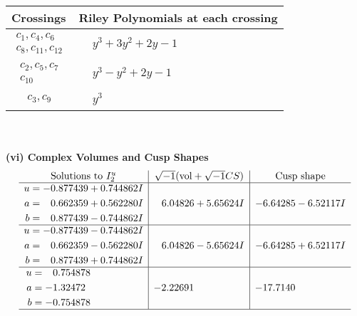 \documentclass[1p]{elsarticle_modified}
\theoremstyle{definition}
\newcommand{\I}{\sqrt{-1}}
\begin{document}
\begin{tabular}{m{50pt}|m{274pt}}
Crossings & \hspace{64pt}Riley Polynomials at each crossing \\
\hline $$\begin{aligned}c_{1},c_{4},c_{6}\\c_{8},c_{11},c_{12}\end{aligned}$$&$\begin{aligned}
&y^3+3 y^2+2 y-1
\end{aligned}$\\
\hline $$\begin{aligned}c_{2},c_{5},c_{7}\\c_{10}\end{aligned}$$&$\begin{aligned}
&y^3- y^2+2 y-1
\end{aligned}$\\
\hline $$\begin{aligned}c_{3},c_{9}\end{aligned}$$&$\begin{aligned}
&y^3
\end{aligned}$\\
\hline
\end{tabular}\\~\\
\newpage\flushleft \textbf{(vi) Complex Volumes and Cusp Shapes}
$$\begin{array}{c|c|c}  
\text{Solutions to }I^u_{2}& \I (\text{vol} + \sqrt{-1}CS) & \text{Cusp shape}\\
 \hline 
\begin{aligned}
u &= -0.877439 + 0.744862 I \\
a &= \phantom{-}0.662359 + 0.562280 I \\
b &= \phantom{-}0.877439 - 0.744862 I\end{aligned}
 & \phantom{-}6.04826 + 5.65624 I & -6.64285 - 6.52117 I \\ \hline\begin{aligned}
u &= -0.877439 - 0.744862 I \\
a &= \phantom{-}0.662359 - 0.562280 I \\
b &= \phantom{-}0.877439 + 0.744862 I\end{aligned}
 & \phantom{-}6.04826 - 5.65624 I & -6.64285 + 6.52117 I \\ \hline\begin{aligned}
u &= \phantom{-}0.754878\phantom{ +0.000000I} \\
a &= -1.32472\phantom{ +0.000000I} \\
b &= -0.754878\phantom{ +0.000000I}\end{aligned}
 & -2.22691\phantom{ +0.000000I} & -17.7140\phantom{ +0.000000I}\\
 \hline 
 \end{array}$$\newpage\newpage\renewcommand{\arraystretch}{1}
\end{document}
